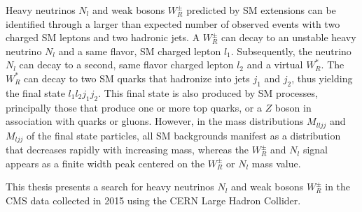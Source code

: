 Heavy neutrinos $N_{l}$ and weak bosons $W^{\pm}_{R}$ predicted by SM extensions can be identified through a larger 
than expected number of observed events with two charged SM leptons and two hadronic jets.  A $W^{\pm}_{R}$ can 
decay to an unstable heavy neutrino $N_{l}$ and a same flavor, SM charged lepton $l_{1}$.  Subsequently, the 
neutrino $N_{l}$ can decay to a second, same flavor charged lepton $l_{2}$ and a virtual $W^{*}_{R}$.  The $W^{*}_{R}$ can 
decay to two SM quarks that hadronize into jets $j_{1}$ and $j_{2}$, thus yielding the final state $l_{1}l_{2}j_{1}j_{2}$.  
This final state is also produced by SM processes, principally those that produce one or more top quarks, or 
a $Z$ boson in association with quarks or gluons.  However, in the mass distributions $M_{lljj}$ and $M_{ljj}$ 
of the final state particles, all SM backgrounds manifest as a distribution that decreases rapidly with increasing 
mass, whereas the $W^{\pm}_{R}$ and $N_{l}$ signal appears as a finite width peak centered on the $W^{\pm}_{R}$ 
or $N_{l}$ mass value.

This thesis presents a search for heavy neutrinos $N_{l}$ and weak bosons $W^{\pm}_{R}$ in the CMS data collected 
in 2015 using the CERN Large Hadron Collider.

